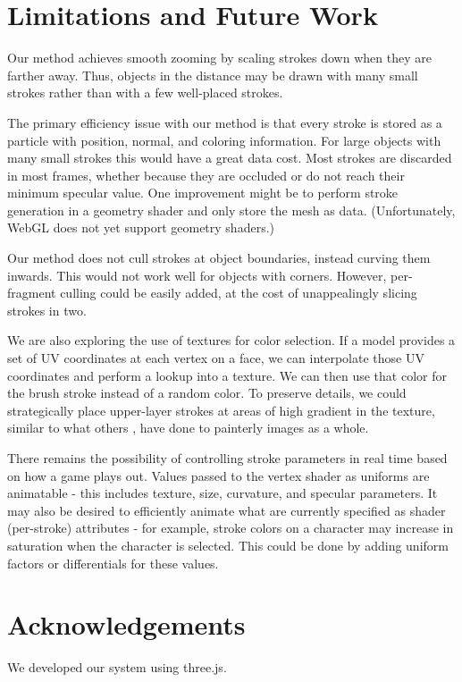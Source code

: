 \documentclass[conference]{acmsiggraph}
\begin{document}
\section{Limitations and Future Work}

Our method achieves smooth zooming by scaling strokes down when they are
farther away. Thus, objects in the distance may be drawn with many small
strokes rather than with a few well-placed strokes.

The primary efficiency issue with our method is that every stroke is stored as
a particle with position, normal, and coloring information. For large objects
with many small strokes this would have a great data cost. Most strokes are
discarded in most frames, whether because they are occluded or do not reach
their minimum specular value. One improvement might be to perform stroke
generation in a geometry shader and only store the mesh as data.
(Unfortunately, WebGL does not yet support geometry shaders.)

Our method does not cull strokes at object boundaries, instead curving them
inwards. This would not work well for objects with corners. However,
per-fragment culling could be easily added, at the cost of unappealingly
slicing strokes in two.

We are also exploring the use of textures for color selection. If a model
provides a set of UV coordinates at each vertex on a face, we can interpolate
those UV coordinates and perform a lookup into a texture. We can then use that
color for the brush stroke instead of a random color. To preserve details, we
could strategically place upper-layer strokes at areas of high gradient in the
texture, similar to what others \cite{Hertzmann:1998:PRC:280814.280951},
\cite{Lu:2010:IPS:1730804.1730825} have done to painterly images as a whole.

There remains the possibility of controlling stroke parameters in real time
based on how a game plays out. Values passed to the vertex shader as uniforms
are animatable - this includes texture, size, curvature, and specular
parameters. It may also be desired to efficiently animate what are currently
specified as shader (per-stroke) attributes - for example, stroke colors on a
character may increase in saturation when the character is selected. This could
be done by adding uniform factors or differentials for these values.


\section*{Acknowledgements}

We developed our system using three.js.



\end{document}
